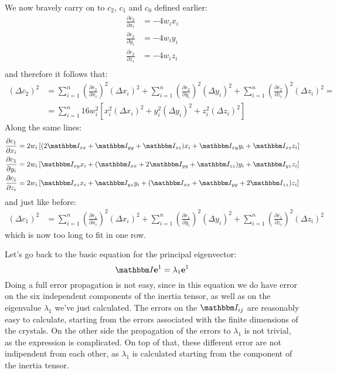 \documentclass[a4paper,11pt]{article}
\newcommand{\pder}[2]{\frac{\partial#1}{\partial#2}}
\newcommand{\itm}{\mathbbm I}
\newcommand{\itc}[1]{\itm_{#1}}
\begin{document}
We now bravely carry on to $c_2$, $c_1$ and $c_0$ defined earlier:
\begin{align}
\pder{c_2}{x_i} &= -4w_ix_i\\
\pder{c_2}{y_i} &= -4w_iy_i\\
\pder{c_2}{z_i} &= -4w_iz_i\\
\end{align}
and therefore it follows that:
\begin{align}
(\Delta c_2)^2 &=
\sum_{i=1}^n \left( \pder{c_2}{x_i} \right)^2(\Delta x_i)^2 +
\sum_{i=1}^n \left( \pder{c_2}{y_i} \right)^2(\Delta y_i)^2 +
\sum_{i=1}^n \left( \pder{c_2}{z_i} \right)^2(\Delta z_i)^2 =\\ 
&=\sum_{i=1}^n 16w_i^2\left[
  x_i^2(\Delta x_i)^2 + y_i^2(\Delta y_i)^2 + z_i^2(\Delta z_i)^2
  \right]
\end{align}
Along the same lines:
\begin{align}
\pder{c_1}{x_i} &= 2w_i\left[
  (2\itc{xx} + \itc{yy} + \itc{zz})x_i + \itc{xy}y_i + \itc{xz}z_i
  \right]\\
\pder{c_1}{y_i} &= 2w_i\left[
  \itc{xy}x_i + (\itc{xx} + 2\itc{yy} + \itc{zz})y_i + \itc{yz}z_i
  \right]\\
\pder{c_1}{z_i} &= 2w_i\left[
  \itc{xz}x_i + \itc{yz}y_i + (\itc{xx} + \itc{yy} + 2\itc{zz})z_i
  \right]
\end{align}
and just like before:
\begin{align}
(\Delta c_1)^2 &=
\sum_{i=1}^n \left( \pder{c_1}{x_i} \right)^2(\Delta x_i)^2 +
\sum_{i=1}^n \left( \pder{c_1}{y_i} \right)^2(\Delta y_i)^2 +
\sum_{i=1}^n \left( \pder{c_1}{z_i} \right)^2(\Delta z_i)^2
\end{align}
which is now too long to fit in one row.

Let's go back to the basic equation for the principal eigenvector:
$$
\itm\mathbf{e}^1 = \lambda_1\mathbf{e}^1
$$
Doing a full error propagation is not easy, since in this equation we do have
error on the six independent components of the inertia tensor, as well as on
the eigenvalue $\lambda_1$ we've just calculated. The errors on the
$\itc{ij}$ are reasonably easy to calculate, starting from the errors
associated with the finite dimensions of the crystals. On the other side
the propagation of the errors to $\lambda_1$ is not trivial, as the
expression is complicated. On top of that, these different error are not
indipendent from each other, as $\lambda_1$ is calculated starting from the
component of the inertia tensor.
\end{document}
